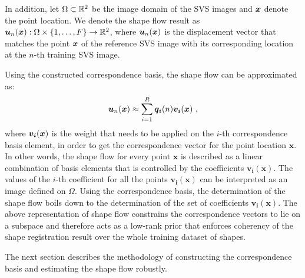 In addition, let $\Omega \subset \mathbb{R}^2$ be the image domain of the SVS images and $\boldsymbol{x}$ denote the point location. We denote the shape flow result as $\bm{u}_n(\boldsymbol{x}):\Omega\times \{1,\ldots,F\}
\rightarrow \mathbb{R}^2$,  where $\bm{u}_n(\boldsymbol{x})$ is the displacement vector that matches the point $\boldsymbol{x}$ of the reference SVS image with its corresponding location at the $n$-th training SVS image.

Using the constructed correspondence basis, the shape flow can be approximated as:
\begin{equation}\label{eq:LinTrajModel}
    \bm{u}_n(\boldsymbol{x}) \approx
    \sum_{i=1}^R\bm{q_i}(n)\bm{v_i}(\boldsymbol{x}) \,\, ,
\end{equation}
where $\bm{v_i}(\boldsymbol{x})$ is the weight that needs to be applied on the $i$-th correspondence basis element, in order to get the correspondence vector for the point location $\bm{x}$. In other words, the shape flow for every point $\bm{x}$ is described as a linear combination of basis elements that is controlled by the coefficients $\bm{v_i}(\bm{x})$.
The values of the $i$-th coefficient for all the points $\bm{v_i}(\bm{x})$ can be interpreted as an image defined on $\Omega$. Using the correspondence basis, the determination of the shape flow boils down to the determination of the set of coefficients $\bm{v_i}(\bm{x})$. The above representation of shape flow constrains the correspondence vectors to lie on a subspace and therefore acts as a low-rank prior that enforces coherency of the shape registration result over the whole training dataset of shapes.


The next section describes the methodology of constructing the correspondence basis and estimating the shape flow robustly.

